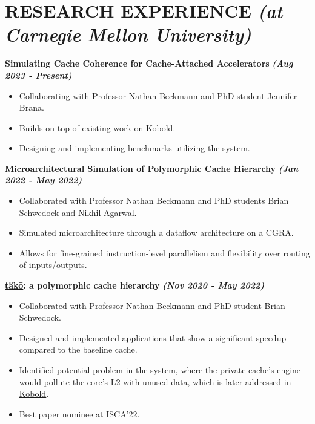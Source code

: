 \documentclass[10pt]{article}
\begin{document}
    \section*{{\large \textcolor{lighterB}{RESEARCH EXPERIENCE}} {\normalsize \textit{\textcolor{lighterB}{(at Carnegie Mellon University)}}}}
  \vspace*{-0.23cm}

  \textbf{\large Simulating Cache Coherence for Cache-Attached Accelerators} {\hfill \textit{\textbf{(Aug 2023 - Present)}}}
  \vspace*{-0.17cm}
  \begin{itemize}
    \itemsep0em
    \item \textcolor{lighterG}{Collaborating with Professor Nathan Beckmann and PhD student Jennifer Brana.}
    \item \textcolor{lighterG}{Builds on top of existing work on \href{https://ieeexplore.ieee.org/document/10106564}{\underline{Kobold}}.}
    \item \textcolor{lighterG}{Designing and implementing benchmarks utilizing the system.}
  \end{itemize}

  \textbf{\large Microarchitectural Simulation of Polymorphic Cache Hierarchy} {\hfill \textit{\textbf{(Jan 2022 - May 2022)}}}
  \vspace*{-0.17cm}
  \begin{itemize}
    \itemsep0em
    \item \textcolor{lighterG}{Collaborated with Professor Nathan Beckmann and PhD students Brian Schwedock and Nikhil Agarwal.}
    \item \textcolor{lighterG}{Simulated microarchitecture through a dataflow architecture on a CGRA.}
    \item \textcolor{lighterG}{Allows for fine-grained instruction-level parallelism and flexibility over routing of inputs/outputs.}
  \end{itemize}

  \textbf{\large \href{https://dl.acm.org/doi/10.1145/3470496.3527379}{\underline{täkō}}: a polymorphic cache hierarchy} {\hfill \textit{\textbf{(Nov 2020 - May 2022)}}} 
  \vspace*{-0.17cm}
  \begin{itemize}
    \itemsep0em
    \item \textcolor{lighterG}{Collaborated with Professor Nathan Beckmann and PhD student Brian Schwedock.}
    \item \textcolor{lighterG}{Designed and implemented applications that show a significant speedup compared to the baseline cache.}
    \item \textcolor{lighterG}{Identified potential problem in the system, where the private cache's engine would pollute the core's L2 with unused data, which is later addressed in \href{https://ieeexplore.ieee.org/document/10106564}{\underline{Kobold}}.}
    \item \textcolor{lighterG}{Best paper nominee at ISCA'22.}
  \end{itemize}
\end{document}
